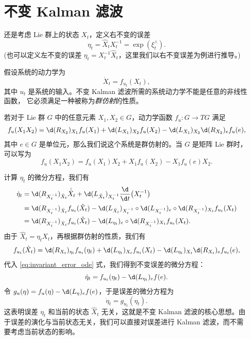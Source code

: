 \documentclass[fontset=none,zihao=-4]{Notes}
\begin{document}
\section{不变 Kalman 滤波}

还是考虑 Lie 群上的状态 $X_t$，定义右不变的误差
\[
  \eta_t=\hat X_tX_t^{-1}=\exp(\xi_t^\wedge).
\]
(也可以定义左不变的误差 $\eta_t=X_t^{-1}\hat X_t$，这里我们以右不变误差为例进行推导。)

假设系统的动力学为
\begin{equation}
  \dot X_t=f_{u_t}(X_t),
\end{equation}
其中 $u_t$ 是系统的输入。不变 Kalman 滤波所需的系统动力学不能是任意的非线性函数，
它必须满足一种被称为\emph{群仿射}的性质。

\begin{definition}[群仿射系统]
  若对于 Lie 群 $G$ 中的任意元素 $X_1,X_2\in G$，动力学函数 $f_u: G \to TG$ 满足
  \begin{equation}
    f_u(X_1X_2)=\d (R_{X_2})_{X_1}f_u(X_1)+\d (L_{X_1})_{X_2}f_u(X_2)-\d (L_{X_1})_{X_2}\d (R_{X_2})_{e}f_u(e),
  \end{equation}
  其中 $e\in G$ 是单位元，那么我们说这个系统是群仿射的。当 $G$ 是矩阵 Lie 群时，
  可以写为
  \[
    f_u(X_1X_2)=f_u(X_1)X_2+X_1f_u(X_2)-X_1f_u(e)X_2.
  \]
\end{definition}

计算 $\eta_t$ 的微分方程，我们有
\begin{equation}\label{eq:invariant_error_ode}
  \begin{aligned}
    \dot\eta_t&=\d (R_{X_t^{-1}})_{\hat X_t}\dot{\hat X}_t+\d (L_{\hat X_t})_{X_t^{-1}}\frac{\d}{\d t}\bigl(X_t^{-1}\bigr)\\
    &=\d (R_{X_t^{-1}})_{\hat X_t}f_{u_t}(\hat X_t)-
    \d (L_{\hat X_t})_{X_t^{-1}}\circ\d (L_{X_t^{-1}})_{e}
    \circ \d (R_{X_t^{-1}})_{X_t}
    f_{u_t}(X_t)\\
    &=\d (R_{X_t^{-1}})_{\hat X_t}f_{u_t}(\hat X_t)-
    \d (L_{\eta_t})_e
    \circ \d (R_{X_t^{-1}})_{X_t}
    f_{u_t}(X_t).
  \end{aligned}
\end{equation}
由于 $\hat X_t=\eta_tX_t$，再根据群仿射的性质，我们有
\[
  f_{u_t}(\hat X_t)=
  \d(R_{X_t})_{\eta_t}f_{u_t}(\eta_t)+\d (L_{\eta_t})_{X_t}f_{u_t}(X_t)-\d (L_{\eta_t})_{X_t}\d (R_{X_t})_{e}f_{u_t}(e),
\]
代入 \eqref{eq:invariant_error_ode} 式，我们得到不变误差的微分方程：
\[
  \dot\eta_t=f_{u_t}(\eta_t)-\d(L_{\eta_t})_{e}f(e).
\]
令 $g_{u}(\eta)=f_u(\eta)-\d (L_{\eta})_e f(e)$，于是误差的微分方程为
\begin{equation}
  \dot\eta_t=g_{u_t}(\eta_t).
\end{equation}
这表明误差 $\eta_t$ 和当前的状态 $\hat X_t$ 无关，这就是不变 Kalman 滤波的核心思想。由于误差的演化与当前状态无关，我们可以直接对误差进行 Kalman 滤波，而不需要考虑当前状态的影响。
\end{document}
